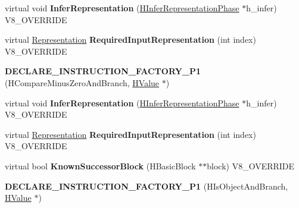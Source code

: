 \begin{DoxyCompactItemize}
\item 
\hypertarget{classv8_1_1internal_1_1_v8___f_i_n_a_l_af3bdd2a407d823e317547d7f761a77c7}{}virtual void {\bfseries Infer\+Representation} (\hyperlink{classv8_1_1internal_1_1_h_infer_representation_phase}{H\+Infer\+Representation\+Phase} $\ast$h\+\_\+infer) V8\+\_\+\+O\+V\+E\+R\+R\+I\+D\+E\label{classv8_1_1internal_1_1_v8___f_i_n_a_l_af3bdd2a407d823e317547d7f761a77c7}

\item 
\hypertarget{classv8_1_1internal_1_1_v8___f_i_n_a_l_a6c6d1f37f40b113d8f4062f1ffff7215}{}virtual \hyperlink{classv8_1_1internal_1_1_representation}{Representation} {\bfseries Required\+Input\+Representation} (int index) V8\+\_\+\+O\+V\+E\+R\+R\+I\+D\+E\label{classv8_1_1internal_1_1_v8___f_i_n_a_l_a6c6d1f37f40b113d8f4062f1ffff7215}

\item 
\hypertarget{classv8_1_1internal_1_1_v8___f_i_n_a_l_aeee5640e3bd7d34d59faae9a0d4aec88}{}{\bfseries D\+E\+C\+L\+A\+R\+E\+\_\+\+I\+N\+S\+T\+R\+U\+C\+T\+I\+O\+N\+\_\+\+F\+A\+C\+T\+O\+R\+Y\+\_\+\+P1} (H\+Compare\+Minus\+Zero\+And\+Branch, \hyperlink{classv8_1_1internal_1_1_h_value}{H\+Value} $\ast$)\label{classv8_1_1internal_1_1_v8___f_i_n_a_l_aeee5640e3bd7d34d59faae9a0d4aec88}

\item 
\hypertarget{classv8_1_1internal_1_1_v8___f_i_n_a_l_af3bdd2a407d823e317547d7f761a77c7}{}virtual void {\bfseries Infer\+Representation} (\hyperlink{classv8_1_1internal_1_1_h_infer_representation_phase}{H\+Infer\+Representation\+Phase} $\ast$h\+\_\+infer) V8\+\_\+\+O\+V\+E\+R\+R\+I\+D\+E\label{classv8_1_1internal_1_1_v8___f_i_n_a_l_af3bdd2a407d823e317547d7f761a77c7}

\item 
\hypertarget{classv8_1_1internal_1_1_v8___f_i_n_a_l_a6c6d1f37f40b113d8f4062f1ffff7215}{}virtual \hyperlink{classv8_1_1internal_1_1_representation}{Representation} {\bfseries Required\+Input\+Representation} (int index) V8\+\_\+\+O\+V\+E\+R\+R\+I\+D\+E\label{classv8_1_1internal_1_1_v8___f_i_n_a_l_a6c6d1f37f40b113d8f4062f1ffff7215}

\item 
\hypertarget{classv8_1_1internal_1_1_v8___f_i_n_a_l_a85ba341b22db01ee3cd7145d9f8e9b99}{}virtual bool {\bfseries Known\+Successor\+Block} (H\+Basic\+Block $\ast$$\ast$block) V8\+\_\+\+O\+V\+E\+R\+R\+I\+D\+E\label{classv8_1_1internal_1_1_v8___f_i_n_a_l_a85ba341b22db01ee3cd7145d9f8e9b99}

\item 
\hypertarget{classv8_1_1internal_1_1_v8___f_i_n_a_l_a7d2c3c1985da19a32671e6d1254e22f0}{}{\bfseries D\+E\+C\+L\+A\+R\+E\+\_\+\+I\+N\+S\+T\+R\+U\+C\+T\+I\+O\+N\+\_\+\+F\+A\+C\+T\+O\+R\+Y\+\_\+\+P1} (H\+Is\+Object\+And\+Branch, \hyperlink{classv8_1_1internal_1_1_h_value}{H\+Value} $\ast$)\label{classv8_1_1internal_1_1_v8___f_i_n_a_l_a7d2c3c1985da19a32671e6d1254e22f0}


\end{DoxyCompactItemize}
